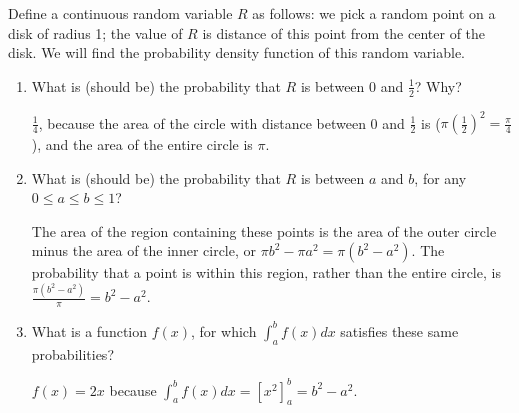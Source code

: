 \question Define a continuous random variable $R$ as follows: we pick 
a random point on a disk of radius 1; the value of $R$ is distance of 
this point from the center of the disk. We will find the probability 
density function of this random variable.

\begin{enumerate}[label=(\alph*)]
\item What is (should be) the probability that $R$ is between 0 and 
$\frac{1}{2}$? Why?
\begin{solution}[.5cm]
$\frac{1}{4}$, because the area of the circle with distance between 
0 and $\frac{1}{2}$ is ($\pi(\frac{1}{2})^2 = \frac{\pi}{4}$), and 
the area of the entire circle is $\pi$.
\end{solution}

\item What is (should be) the probability that $R$ is between $a$ 
and $b$, for any $0 \le a \le b \le 1$?
\begin{solution}[.5cm]
The area of the region containing these points is the area of the 
outer circle minus the area of the inner circle, or $\pi b^2 - \pi a^2 
= \pi(b^2 - a^2)$. The probability that a point is within this region, 
rather than the entire circle, is $\frac{\pi(b^2 - a^2)}{\pi} = b^2 - a^2$.
\end{solution}

\item What is a function $f(x)$, for which $\int_{a}^{b} f(x)dx$ 
satisfies these same probabilities?
\begin{solution}[.5cm] $f(x) = 2x$ because $\int_{a}^{b} f(x)dx = 
[x^2]_{a}^{b} = b^2 - a^2$. \end{solution}

\end{enumerate}